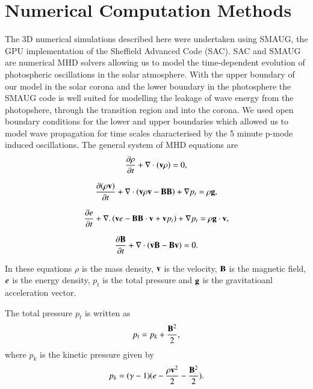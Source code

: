 \documentclass[authoryear,final,1p]{elsarticle}
\begin{document}
\section{Numerical Computation Methods}
The 3D numerical simulations described here were undertaken using SMAUG, the GPU implementation of the Sheffield Advanced Code (SAC)\citet{Griffiths2015}\citet{Shelyag2008}. SAC and SMAUG are numerical MHD solvers allowing us to model the time-dependent evolution of photospheric oscillations in the solar atmosphere.  With the upper boundary of our model in the solar corona and the lower boundary in the photosphere the SMAUG code is well suited for modelling the leakage of wave energy from the photopshere, through the transition region and into the corona. We used open boundary conditions for the lower and upper boundaries which allowed us to model wave propagation for time scales characterised by the 5 minute p-mode induced oscillations. The general system of MHD equations are
\begin{equation}\label{eqdens}
{{\partial \rho}\over{\partial t}}+\nabla\cdot\left( {\bf v}\rho\right)=0,
\end{equation}

\begin{equation}\label{eqmom}
{{\partial ( \rho {\bf v})}\over{\partial t}}+\nabla\cdot\left( {\bf v}\rho {\bf v}-{\bf B B}\right)+\nabla p_t=\rho{\bf g},
\end{equation}

\begin{equation}\label{eqe}
{{\partial e}\over{\partial t}}+\nabla.\left({\bf v}e-{\bf B B}\cdot{\bf v}+{\bf v}p_{t}\right)+\nabla p_t=\rho{\bf g}\cdot{\bf v},
\end{equation}

\begin{equation}\label{eqb}
{{\partial{\bf B}}\over{\partial t}} +\nabla \cdot\left(  {\bf vB}-{\bf Bv}\right)=0.
\end{equation}

In these equations $\rho$ is the mass density, $  \bf { v} $ is the velocity,   $ \bf B$ is the magnetic field, $\it{e}$ is the energy density, $p_{t}$ is the total pressure and $\bf g$ is the gravitatioanl acceleration vector.

The total pressure $p_{t}$ is written as
\begin{equation}\label{eqpt}
p_{t}=p_{k}+{{\bf B}^{2}\over{2}},
\end{equation}
where $p_k$ is the kinetic pressure given by
\begin{equation}\label{eqpk}
p_{k}=(\gamma - 1)( e-{{\rho \bf v }^{2}\over{2}}-  {{\bf B}^{2}\over{2}} ).
\end{equation}
\end{document}
